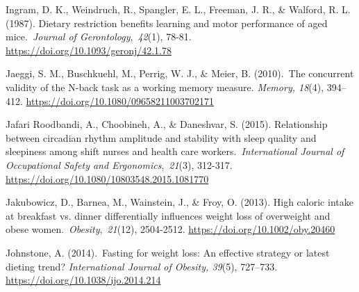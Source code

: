 \documentclass[authordate, empirical,issue]{jote-new-article}
\begin{document}
Ingram, D. K., Weindruch, R., Spangler, E. L., Freeman, J. R., \& Walford, R. L. (1987). Dietary restriction benefits learning and motor performance of aged mice. \emph{Journal of Gerontology}, \emph{42}(1), 78-81. \url{https://doi.org/10.1093/geronj/42.1.78}



Jaeggi, S. M., Buschkuehl, M., Perrig, W. J., \& Meier, B. (2010). The concurrent validity of the N-back task as a working memory measure.\emph{ Memory, 18}(4), 394--412. \url{https://doi.org/10.1080/09658211003702171}



Jafari Roodbandi, A., Choobineh, A., \& Daneshvar, S. (2015). Relationship between circadian rhythm amplitude and stability with sleep quality and sleepiness among shift nurses and health care workers. \emph{International Journal of Occupational Safety and Ergonomics}, \emph{21}(3), 312-317. \url{https://doi.org/10.1080/10803548.2015.1081770}



Jakubowicz, D., Barnea, M., Wainstein, J., \& Froy, O. (2013). High caloric intake at breakfast vs. dinner differentially influences weight loss of overweight and obese women. \emph{Obesity}, \emph{21}(12), 2504-2512. \url{https://doi.org/10.1002/oby.20460}









Johnstone, A. (2014). Fasting for weight loss: An effective strategy or latest dieting trend?\emph{ International Journal of Obesity, 39}(5), 727--733. \url{https://doi.org/10.1038/ijo.2014.214}



\end{document}
